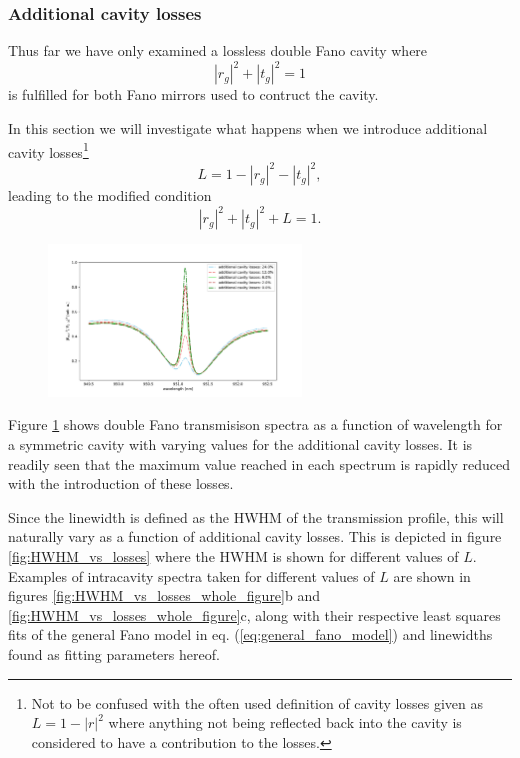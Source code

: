 \subsubsection{Additional cavity losses}

Thus far we have only examined a lossless double Fano cavity where
\begin{equation}
    |r_g|^2 + |t_g|^2 = 1
\end{equation}
is fulfilled for both Fano mirrors used to contruct the cavity.

In this section we will investigate what happens when we introduce additional cavity losses\footnote{Not to be confused with the often used definition of cavity losses given as $L=1-|r|^2$ where anything not being reflected back into the cavity is considered to have a contribution to the losses.}
\begin{equation}
    L = 1 - |r_g|^2 - |t_g|^2,
\end{equation}
leading to the modified condition
\begin{equation}
    |r_g|^2 + |t_g|^2 + L = 1.
\end{equation}

\begin{figure}[h!]
    \centering
    \includegraphics[width=0.6\textwidth]{figures/double_fano_loss_scan.pdf}
    \caption{}
    \label{fig:double_loss_scan}
\end{figure}

Figure \ref{fig:double_loss_scan} shows double Fano transmisison spectra as a function of wavelength for a symmetric cavity with varying values for the additional cavity losses. It is readily seen that the maximum value reached in each spectrum is rapidly reduced with the introduction of these losses. 

Since the linewidth is defined as the HWHM of the transmission profile, this will naturally vary as a function of additional cavity losses. This is depicted in figure \ref{fig:HWHM_vs_losses} where the HWHM is shown for different values of $L$. Examples of intracavity spectra taken for different values of $L$ are shown in figures \ref{fig:HWHM_vs_losses_whole_figure}b and \ref{fig:HWHM_vs_losses_whole_figure}c, along with their respective least squares fits of the general Fano model in eq. (\ref{eq:general_fano_model}) and linewidths found as fitting parameters hereof. 

